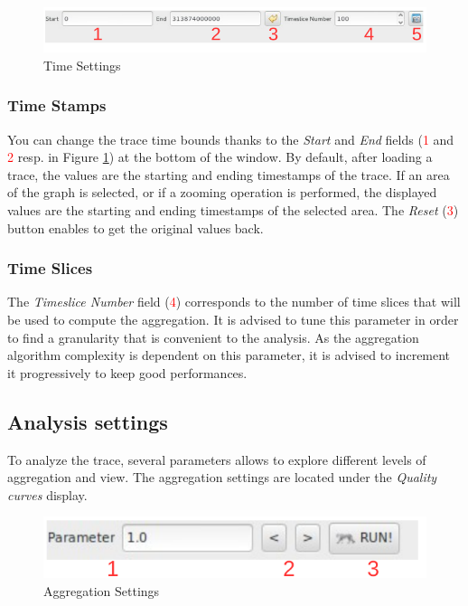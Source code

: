 \documentclass[twoside]{article}
\begin{document}
\begin{sloppypar}
\begin{figure}[h!]
	\centering
	\includegraphics[width=1.0\textwidth]{images/ocelotl_bottom_time.pdf}
	\caption{Time Settings}
	\label{timeSettings}
\end{figure}

\subsubsection{Time Stamps}
You can change the trace time bounds thanks to the \textit{Start} and \textit{End} fields (\textcolor{red}{1} and \textcolor{red}{2} resp. in Figure \ref{timeSettings}) at the bottom of the window. By default, after loading a trace, the values are the starting and ending timestamps of the trace. If an area of the graph is selected, or if a zooming operation is performed, the displayed values are the starting and ending timestamps of the selected area. The \textit{Reset} (\textcolor{red}{3}) button enables to get the original values back.

\subsubsection{Time Slices}
The \textit{Timeslice Number} field (\textcolor{red}{4}) corresponds to the number of time slices that will be used to compute the aggregation. It is advised to tune this parameter in order to find a granularity that is convenient to the analysis. As the aggregation algorithm complexity is dependent on this parameter, it is advised to increment it progressively to keep good performances.

\subsection{Analysis settings}
To analyze the trace, several parameters allows to explore  different levels of aggregation and view. The aggregation settings are located under the \textit{Quality curves} display.
 
\begin{figure}[h!]
	\centering
	\includegraphics[scale=0.8]{images/aggregationSettings.pdf}
	\caption{Aggregation Settings}
	\label{aggregSettings}
\end{figure}


\end{sloppypar}
\end{document}
